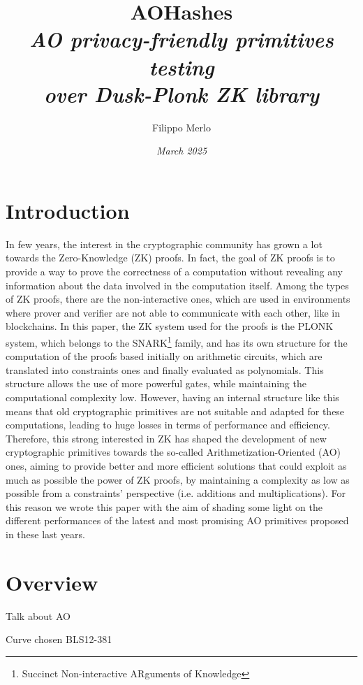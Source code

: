 \documentclass[12pt, a4paper]{report}
\title{{\textbf{AOHashes}}\\[20pt]\textsl{AO privacy-friendly primitives testing\\over Dusk-Plonk ZK library}}
\author{\Large{Filippo Merlo}}
\date{\textit{March 2025}}
\begin{document}
\maketitle
\newpage
{}
\tableofcontents
\pagebreak

\chapter{Introduction}\label{chap:intro}

In few years, the interest in the cryptographic community has grown a lot towards the Zero-Knowledge (ZK) proofs. In fact, the goal of ZK proofs is to provide a way to prove the correctness of a computation without revealing any information about the data involved in the computation itself. Among the types of ZK proofs, there are the non-interactive ones, which are used in environments where prover and verifier are not able to communicate with each other, like in blockchains. In this paper, the ZK system used for the proofs is the PLONK system, which belongs to the SNARK\footnote{Succinct Non-interactive ARguments of Knowledge} family, and has its own structure for the computation of the proofs based initially on arithmetic circuits, which are translated into constraints ones and finally evaluated as polynomials. This structure allows the use of more powerful gates, while maintaining the computational complexity low.
However, having an internal structure like this means that old cryptographic primitives are not suitable and adapted for these computations, leading to huge losses in terms of performance and efficiency. Therefore, this strong interested in ZK has shaped the development of new cryptographic primitives towards the so-called Arithmetization-Oriented (AO) ones, aiming to provide better and more efficient solutions that could exploit as much as possible the power of ZK proofs, by maintaining a complexity as low as possible from a constraints' perspective (i.e. additions and multiplications). For this reason we wrote this paper with the aim of shading some light on the different performances of the latest and most promising AO primitives proposed in these last years.

\chapter{Overview}\label{chap:overview}

Talk about AO

Curve chosen BLS12-381
\end{document}
